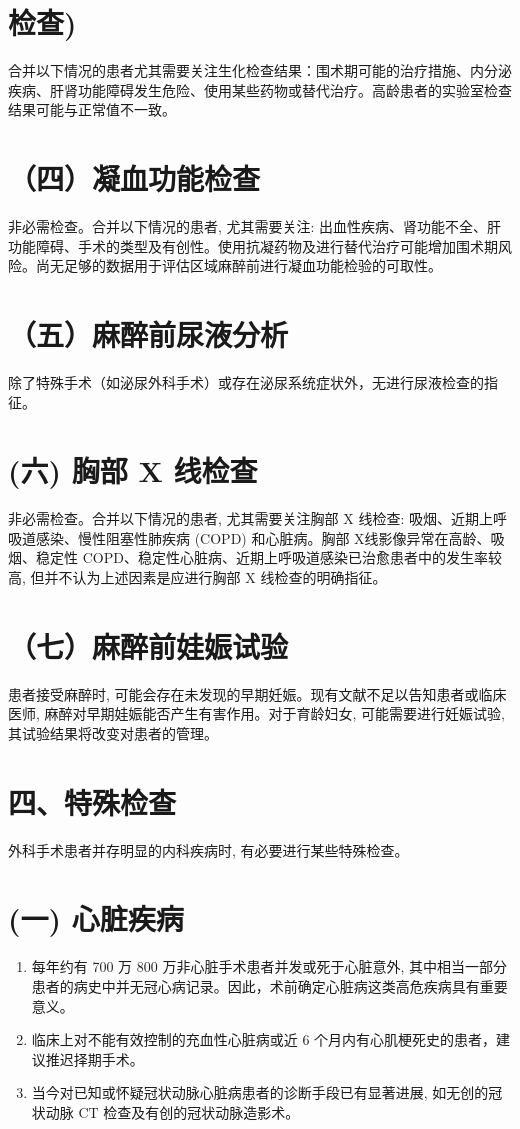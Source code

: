 \documentclass[10pt]{article}
\begin{document}
\section*{检查)}
合并以下情况的患者尤其需要关注生化检查结果：围术期可能的治疗措施、内分泌疾病、肝肾功能障碍发生危险、使用某些药物或替代治疗。高龄患者的实验室检查结果可能与正常值不一致。

\section*{（四）凝血功能检查}
非必需检查。合并以下情况的患者, 尤其需要关注: 出血性疾病、肾功能不全、肝功能障碍、手术的类型及有创性。使用抗凝药物及进行替代治疗可能增加围术期风险。尚无足够的数据用于评估区域麻醉前进行凝血功能检验的可取性。

\section*{（五）麻醉前尿液分析}
除了特殊手术（如泌尿外科手术）或存在泌尿系统症状外，无进行尿液检查的指征。

\section*{(六) 胸部 X 线检查}
非必需检查。合并以下情况的患者, 尤其需要关注胸部 X 线检查: 吸烟、近期上呼吸道感染、慢性阻塞性肺疾病 (COPD) 和心脏病。胸部 X线影像异常在高龄、吸烟、稳定性 COPD、稳定性心脏病、近期上呼吸道感染已治愈患者中的发生率较高, 但并不认为上述因素是应进行胸部 X 线检查的明确指征。

\section*{（七）麻醉前娃娠试验}
患者接受麻醉时, 可能会存在未发现的早期妊娠。现有文献不足以告知患者或临床医师, 麻醉对早期娃娠能否产生有害作用。对于育龄妇女, 可能需要进行妊娠试验, 其试验结果将改变对患者的管理。

\section*{四、特殊检查}
外科手术患者并存明显的内科疾病时, 有必要进行某些特殊检查。

\section*{(一) 心脏疾病}
\begin{enumerate}
  \item 每年约有 700 万 800 万非心脏手术患者并发或死于心脏意外, 其中相当一部分患者的病史中并无冠心病记录。因此，术前确定心脏病这类高危疾病具有重要意义。

  \item 临床上对不能有效控制的充血性心脏病或近 6 个月内有心肌梗死史的患者，建议推迟择期手术。

  \item 当今对已知或怀疑冠状动脉心脏病患者的诊断手段已有显著进展, 如无创的冠状动脉 $\mathrm{CT}$ 检查及有创的冠状动脉造影术。

\end{enumerate}
\end{document}
